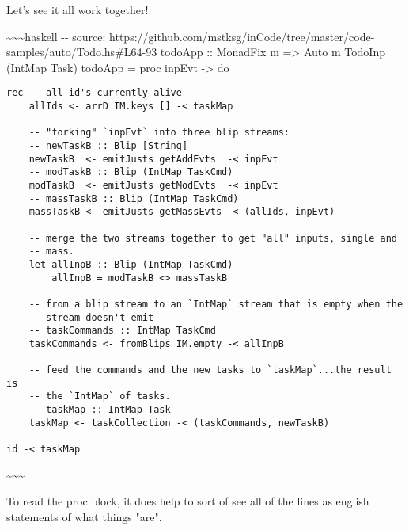 \documentclass[]{article}
\begin{document}
Let's see it all work together!

\textasciitilde{}\textasciitilde{}\textasciitilde{}haskell -\/- source:
https://github.com/mstksg/inCode/tree/master/code-samples/auto/Todo.hs\#L64-93
todoApp :: MonadFix m =\textgreater{} Auto m TodoInp (IntMap Task) todoApp =
proc inpEvt -\textgreater{} do

\begin{verbatim}
rec -- all id's currently alive
    allIds <- arrD IM.keys [] -< taskMap

    -- "forking" `inpEvt` into three blip streams:
    -- newTaskB :: Blip [String]
    newTaskB  <- emitJusts getAddEvts  -< inpEvt
    -- modTaskB :: Blip (IntMap TaskCmd)
    modTaskB  <- emitJusts getModEvts  -< inpEvt
    -- massTaskB :: Blip (IntMap TaskCmd)
    massTaskB <- emitJusts getMassEvts -< (allIds, inpEvt)

    -- merge the two streams together to get "all" inputs, single and
    -- mass.
    let allInpB :: Blip (IntMap TaskCmd)
        allInpB = modTaskB <> massTaskB

    -- from a blip stream to an `IntMap` stream that is empty when the
    -- stream doesn't emit
    -- taskCommands :: IntMap TaskCmd
    taskCommands <- fromBlips IM.empty -< allInpB

    -- feed the commands and the new tasks to `taskMap`...the result is
    -- the `IntMap` of tasks.
    -- taskMap :: IntMap Task
    taskMap <- taskCollection -< (taskCommands, newTaskB)

id -< taskMap
\end{verbatim}

\textasciitilde{}\textasciitilde{}\textasciitilde{}

To read the proc block, it does help to sort of see all of the lines as english
statements of what things "are".
\end{document}
